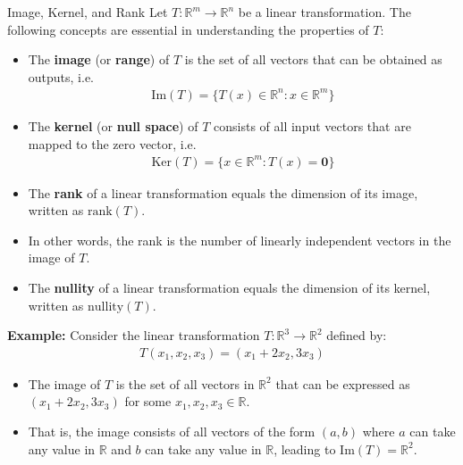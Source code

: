 \begin{frame}{Image, Kernel, and Rank}
    Let $T:\mathbb{R}^m \rightarrow \mathbb{R}^n$ be a linear transformation. The following concepts are essential in understanding the properties of $T$:
    \begin{itemize}
        \item The \textbf{image} (or \textbf{range}) of $T$ is the set of all vectors that can be obtained as outputs, i.e.  
        \begin{align*}
            \text{Im}(T) = \{T(x)\in \mathbb{R}^n : x \in \mathbb{R}^m\}
        \end{align*}
        \item The \textbf{kernel} (or \textbf{null space}) of $T$ consists of all input vectors that are mapped to the zero vector, i.e. 
        \begin{align*}
             \text{Ker}(T) = \{x \in \mathbb{R}^m : T(x) = \mathbf{0}\}
        \end{align*}
    \end{itemize}
\end{frame}
\begin{frame}
    \begin{itemize}
    
        \item The \textbf{rank} of a linear transformation equals the dimension of its image, written as $\text{rank}(T)$.
        \item In other words, the rank is the number of linearly independent vectors in the image of $T$.
        \item The \textbf{nullity} of a linear transformation equals the dimension of its kernel, written as $\text{nullity}(T)$.  
    \end{itemize}
\end{frame}

\begin{frame}
    \textbf{Example:} Consider the linear transformation $T:\mathbb{R}^3 \rightarrow \mathbb{R}^2$ defined by:
    \begin{align*}
        T(x_1, x_2, x_3) = (x_1 + 2x_2, 3x_3)
    \end{align*}
    \begin{itemize}
        \item The image of $T$ is the set of all vectors in $\mathbb{R}^2$ that can be expressed as $(x_1 + 2x_2, 3x_3)$ for some $x_1, x_2, x_3 \in \mathbb{R}$.
        \item That is, the image consists of all vectors of the form $(a, b)$ where $a$ can take any value in $\mathbb{R}$ and $b$ can take any value in $\mathbb{R}$, leading to $\text{Im}(T) = \mathbb{R}^2$.
    \end{itemize}   
\end{frame}

